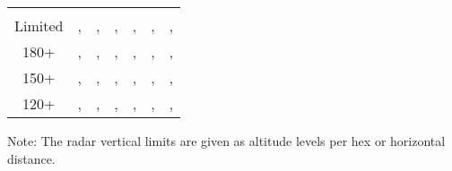 \begin{twocolumntablefloat}
\begin{twocolumntable}
\begin{tabularx}{0.8\linewidth}{c*{6}{C}}
\toprule
{}&
&
&
&
&
&
\\
\\
\midrule
Limited&, &, &, &, &, &, \\
180+&, &, &, &, &, &, \\
150+&, &, &, &, &, &, \\
120+&, &, &, &, &, &, \\
\bottomrule
\end{tabularx}
\begin{tablenote}{0.8\linewidth}
Note: The radar vertical limits are given as altitude levels per hex or horizontal distance. 
\end{tablenote}

\end{twocolumntable}
\end{twocolumntablefloat}


